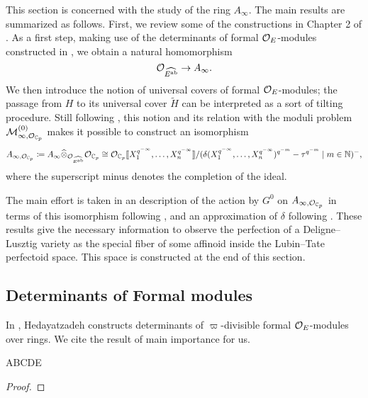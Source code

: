 \documentclass[../main.tex]{subfiles}
\begin{document}
This section is concerned with the study of the ring $A_\infty$. 
The main results are summarized as follows. 
First, we review some of the constructions in Chapter 2 of \cite{weinstein2016semistable}.
As a first step, making use of the determinants of formal $\mathcal{O}_E$-modules constructed in 
\cite{hedayatzadeh2015det}, we obtain a natural homomorphism
\begin{equation*}
   \mathcal{O}_{\widehat{E^{\mathrm{ab}}}} \to  A_\infty.
\end{equation*}
We then introduce the notion of universal covers of formal $\mathcal{O}_E$-modules; the 
passage from $H$ to its universal cover $\tilde H$ can be interpreted as a sort
of tilting procedure. Still following \cite{weinstein2016semistable}, this
notion and its relation with the moduli problem $\mathcal{M}_{\infty,
\mathcal{O}_{\mathbb{C}_p}}^{(0)}$ makes it possible to construct an isomorphism
\begin{equation}\label{eq:ExplicitAinftyBCtoOC}
  A_{\infty, \mathcal{O}_{\mathbb{C}_p}} \coloneq A_\infty \widehat \otimes_{\mathcal{O}_{\widehat{E^{\mathrm{ab}}}}}
  \mathcal{O}_{\mathbb{C}_p} 
  \cong \mathcal{O}_{\mathbb{C}_p} \llbracket X_1^{q^{-\infty}}, \dots, X_n^{q^{-\infty}} \rrbracket /
  (\delta(X_1^{q^{-\infty}}, \dots, X_n^{q^{-\infty}})^{q^{-m}} - \tau^{q^{-m}} \mid 
  m \in \mathbb{N})^- ,
\end{equation}
where the superscript minus denotes the completion of the ideal. 

The main effort is taken in an description of the action by $G^0$ 
on $A_{\infty,\mathcal{O}_{\mathbb{C}_p}}$ in terms of this isomorphism following
\cite[Section 1.2]{imaitsushima2020affinoids}, 
and an approximation of $\delta$ following \cite[Section
2.10]{BoyarchenkoWeinstein2011MaxVar}.
These results give the necessary information to observe the perfection of a
Deligne--Lusztig variety as the special fiber of some affinoid inside the
Lubin--Tate perfectoid space. This space is constructed at the end of this section.

\subsection{Determinants of Formal modules} %
\label{sub:Determinants of Formal modules}
In \cite{hedayatzadeh2015det}, Hedayatzadeh constructs determinants of 
$\varpi$-divisible formal $\mathcal{O}_E$-modules over  rings. 
We cite the result of main importance for us.
\begin{thm}\label{thm:HedayatzadehsResult}
  ABCDE
\begin{proof}
\end{proof}
\end{thm}
\end{document}
